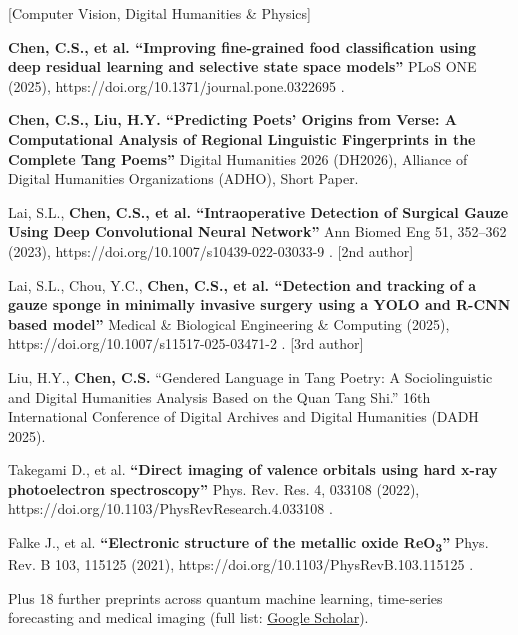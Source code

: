\documentclass[letterpaper,10pt]{article}
\newcommand{\resumeSubHeadingListStart}{\begin{itemize}[leftmargin=0.15in, label={}]}
\newcommand{\resumeSubHeadingListEnd}{\end{itemize}}
\begin{document}
   [Computer Vision, Digital Humanities \& Physics]
  \resumeSubHeadingListStart
    \small{\item{

    \textbf{Chen, C.S., et al. ``Improving fine-grained food classification using deep residual learning and selective state space models''}{ PLoS ONE (2025), https://doi.org/10.1371/journal.pone.0322695 .} \\ \vspace{1pt}

    \textbf{Chen, C.S., Liu, H.Y. ``Predicting Poets' Origins from Verse: A Computational Analysis of Regional Linguistic Fingerprints in the Complete Tang Poems''}{ Digital Humanities 2026 (DH2026), Alliance of Digital Humanities Organizations (ADHO), Short Paper.} \\ \vspace{1pt}

    Lai, S.L., \textbf{Chen, C.S., et al. ``Intraoperative Detection of Surgical Gauze Using Deep Convolutional Neural Network''}{ Ann Biomed Eng 51, 352–362 (2023), https://doi.org/10.1007/s10439-022-03033-9 . [2nd author]} \\ \vspace{1pt}

    Lai, S.L., Chou, Y.C., \textbf{Chen, C.S., et al. ``Detection and tracking of a gauze sponge in minimally invasive surgery using a YOLO and R-CNN based model''}{ Medical \& Biological Engineering \& Computing (2025), https://doi.org/10.1007/s11517-025-03471-2 . [3rd author]} \\ \vspace{1pt}

    Liu, H.Y., \textbf{Chen, C.S.} ``Gendered Language in Tang Poetry: A Sociolinguistic and Digital Humanities Analysis Based on the Quan Tang Shi.'' {16th International Conference of Digital Archives and Digital Humanities (DADH 2025).} \\ \vspace{1pt}

    Takegami D., et al. \textbf{``Direct imaging of valence orbitals using hard x-ray photoelectron spectroscopy''} {Phys. Rev. Res. 4, 033108 (2022), https://doi.org/10.1103/PhysRevResearch.4.033108 .} \\ \vspace{1pt}

    Falke J., et al. \textbf{``Electronic structure of the metallic oxide ReO\textsubscript{3}''} {Phys. Rev. B 103, 115125 (2021), https://doi.org/10.1103/PhysRevB.103.115125 .}

    Plus 18 further preprints across quantum machine learning, time-series forecasting and medical imaging (full list: \href{https://scholar.google.com.tw/citations?user=5XHD7nkAAAAJ}{Google Scholar}).
    }}
  \resumeSubHeadingListEnd
\end{document}
